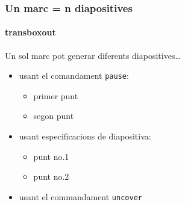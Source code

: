 \documentclass[12pt]{beamer}
\begin{document}
\begin{frame}
  \frametitle{Un marc = n diapositives}
  \framesubtitle{transboxout}

  Un sol marc pot generar diferents diapositives\dots
  \begin{itemize}
  \item usant el comandament \texttt{pause}:
    \begin{itemize}
    \item
      primer punt
      \pause
    \item    
      segon punt
    \end{itemize}
  \item
    usant especificacions de diapositiva:
    \begin{itemize}
    \item<3->
      punt no.1
    \item<4->
      punt no.2
    \end{itemize}
  \item
    usant el commandament \texttt{uncover}
    \begin{itemize}
    \end{itemize}
  \end{itemize}
  \transboxout
  
\end{frame}
\end{document}
